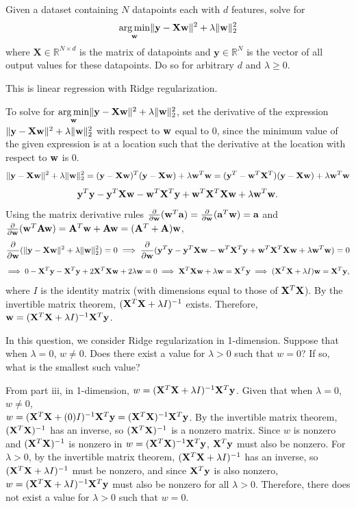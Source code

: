 \subproblem
Given a dataset containing $N$ datapoints each with $d$ features, solve for
\[\underset{\mathbf{w}}{\operatorname{arg\,min}} \Vert\mathbf{y} - \mathbf{X}\mathbf{w}\Vert^2 + \lambda\Vert\mathbf{w}\Vert_2^2
\]
where $\mathbf{X} \in \mathbb{R}^{N \times d}$ is the matrix of datapoints and $\mathbf{y} \in \mathbb{R}^N$ is the  vector of all output values for these datapoints. Do so for arbitrary $d$ and $\lambda \geq 0$.

This is linear regression with Ridge regularization.

To solve for $\underset{\mathbf{w}}{\operatorname{arg\,min}} \Vert \mathbf{y} - \mathbf{X} \mathbf{w} \Vert^2 + \lambda\Vert \mathbf{w}\Vert_2^2$, set the derivative of the expression $\Vert \mathbf{y} - \mathbf{X} \mathbf{w} \Vert^2 + \lambda\Vert \mathbf{w}\Vert_2^2$ with respect to $\mathbf{w}$ equal to 0, since the minimum value of the given expression is at a location such that the derivative at the location with respect to $\mathbf{w}$ is 0.
\[ \Vert \mathbf{y} - \mathbf{X} \mathbf{w} \Vert^2 + \lambda\Vert \mathbf{w}\Vert_2^2 = (\mathbf{y} - \mathbf{X} \mathbf{w})^T(\mathbf{y} - \mathbf{X} \mathbf{w}) + \lambda \mathbf{w}^T\mathbf{w} = (\mathbf{y}^T - \mathbf{w}^T\mathbf{X}^T)(\mathbf{y} - \mathbf{X} \mathbf{w}) + \lambda \mathbf{w}^T\mathbf{w} \]
\[ \mathbf{y}^T\mathbf{y} - \mathbf{y}^T \mathbf{X}\mathbf{w} - \mathbf{w}^T\mathbf{X}^T \mathbf{y} + \mathbf{w}^T\mathbf{X}^T \mathbf{X}\mathbf{w} + \lambda \mathbf{w}^T\mathbf{w}. \]
Using the matrix derivative rules $\frac{\partial}{\partial \mathbf{w}}(\mathbf{w}^T \mathbf{a}) = \frac{\partial}{\partial \mathbf{w}}(\mathbf{a}^T \mathbf{w}) = \mathbf{a}$ and $\frac{\partial}{\partial \mathbf{w}}(\mathbf{w}^T\mathbf{A}\mathbf{w}) = \mathbf{A}^T\mathbf{w} + \mathbf{A}\mathbf{w} = (\mathbf{A}^T + \mathbf{A})\mathbf{w}$,
\[ \frac{\partial}{\partial \mathbf{w}}(\Vert \mathbf{y} - \mathbf{X} \mathbf{w} \Vert^2 + \lambda\Vert \mathbf{w}\Vert_2^2) = 0 \implies \frac{\partial}{\partial \mathbf{w}}(\mathbf{y}^T\mathbf{y} - \mathbf{y}^T \mathbf{X}\mathbf{w} - \mathbf{w}^T\mathbf{X}^T \mathbf{y} + \mathbf{w}^T\mathbf{X}^T \mathbf{X}\mathbf{w} + \lambda \mathbf{w}^T\mathbf{w}) = 0 \]
\[ \implies 0 - \mathbf{X}^T\mathbf{y} - \mathbf{X}^T\mathbf{y} + 2 \mathbf{X}^T\mathbf{X}\mathbf{w} + 2\lambda \mathbf{w} = 0 \implies \mathbf{X}^T\mathbf{X}\mathbf{w} + \lambda\mathbf{w} = \mathbf{X}^T\mathbf{y} \implies (\mathbf{X}^T\mathbf{X} + \lambda I)\mathbf{w} = \mathbf{X}^T\mathbf{y}, \]
where $I$ is the identity matrix (with dimensions equal to those of $\mathbf{X}^T\mathbf{X}$). By the invertible matrix theorem, $(\mathbf{X}^T\mathbf{X} + \lambda I)^{-1}$ exists. Therefore, $\mathbf{w} = (\mathbf{X}^T\mathbf{X} + \lambda I)^{-1}\mathbf{X}^T\mathbf{y}$.

\subproblem In this question, we consider Ridge regularization in 1-dimension. Suppose that when $\lambda = 0$, $w \neq 0$. Does there exist a value for $\lambda > 0$ such that $w = 0$? If so, what is the smallest such value?

From part iii, in 1-dimension, $w = (\mathbf{X}^T\mathbf{X} + \lambda I)^{-1}\mathbf{X}^T\mathbf{y}$. Given that when $\lambda = 0$, $w \neq 0$,\\
$w = (\mathbf{X}^T\mathbf{X} + (0) I)^{-1}\mathbf{X}^T\mathbf{y} = (\mathbf{X}^T\mathbf{X})^{-1}\mathbf{X}^T\mathbf{y}$. By the invertible matrix theorem, $(\mathbf{X}^T\mathbf{X})^{-1}$ has an inverse, so $(\mathbf{X}^T\mathbf{X})^{-1}$ is a nonzero matrix. Since $w$ is nonzero and $(\mathbf{X}^T\mathbf{X})^{-1}$ is nonzero in $w = (\mathbf{X}^T\mathbf{X})^{-1}\mathbf{X}^T\mathbf{y}$, $\mathbf{X}^T\mathbf{y}$ must also be nonzero. For $\lambda > 0$, by the invertible matrix theorem, $(\mathbf{X}^T\mathbf{X} + \lambda I)^{-1}$ has an inverse, so $(\mathbf{X}^T\mathbf{X} + \lambda I)^{-1}$ must be nonzero, and since $\mathbf{X}^T\mathbf{y}$ is also nonzero, $w = (\mathbf{X}^T\mathbf{X} + \lambda I)^{-1}\mathbf{X}^T\mathbf{y}$ must also be nonzero for all $\lambda > 0$. Therefore, there does not exist a value for $\lambda > 0$ such that $w = 0$.




